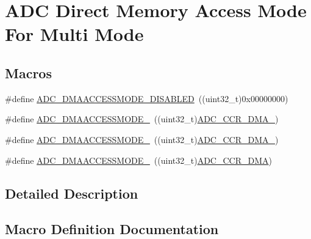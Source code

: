 \hypertarget{group___a_d_c_ex___direct__memory__access__mode__for__multi__mode}{}\section{A\+DC Direct Memory Access Mode For Multi Mode}
\label{group___a_d_c_ex___direct__memory__access__mode__for__multi__mode}
\subsection*{Macros}
\begin{DoxyCompactItemize}
\item 
\#define \hyperlink{group___a_d_c_ex___direct__memory__access__mode__for__multi__mode_ga59163da6d23f587f951ce21d74542795}{A\+D\+C\+\_\+\+D\+M\+A\+A\+C\+C\+E\+S\+S\+M\+O\+D\+E\+\_\+\+D\+I\+S\+A\+B\+L\+ED}~((uint32\+\_\+t)0x00000000)
\item 
\#define \hyperlink{group___a_d_c_ex___direct__memory__access__mode__for__multi__mode_gadb55bb780e7c0a58878287f205f88e33}{A\+D\+C\+\_\+\+D\+M\+A\+A\+C\+C\+E\+S\+S\+M\+O\+D\+E\+\_}~((uint32\+\_\+t)\hyperlink{group___peripheral___registers___bits___definition_ga3a42ee6ec5115244aef8f60d35abcc47}{A\+D\+C\+\_\+\+C\+C\+R\+\_\+\+D\+M\+A\+\_})
\item 
\#define \hyperlink{group___a_d_c_ex___direct__memory__access__mode__for__multi__mode_ga33b7e654725c8de70c9ca5a1e1b3d139}{A\+D\+C\+\_\+\+D\+M\+A\+A\+C\+C\+E\+S\+S\+M\+O\+D\+E\+\_}~((uint32\+\_\+t)\hyperlink{group___peripheral___registers___bits___definition_gacdc9d29cafdd54e5c0dd752c358e1bc8}{A\+D\+C\+\_\+\+C\+C\+R\+\_\+\+D\+M\+A\+\_})
\item 
\#define \hyperlink{group___a_d_c_ex___direct__memory__access__mode__for__multi__mode_ga2613348408ee2a5685f1d06f6f7780dc}{A\+D\+C\+\_\+\+D\+M\+A\+A\+C\+C\+E\+S\+S\+M\+O\+D\+E\+\_}~((uint32\+\_\+t)\hyperlink{group___peripheral___registers___bits___definition_ga9e346b21afcaeced784e6c80b3aa1fb4}{A\+D\+C\+\_\+\+C\+C\+R\+\_\+\+D\+MA})
\end{DoxyCompactItemize}


\subsection{Detailed Description}


\subsection{Macro Definition Documentation}

